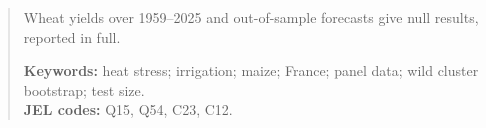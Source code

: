 \begin{abstract}
Wheat yields over 1959--2025 and out-of-sample forecasts give null results, reported in full.

\medskip\noindent\textbf{Keywords:} heat stress; irrigation; maize; France; panel data; wild cluster bootstrap; test size.\\
\textbf{JEL codes:} Q15, Q54, C23, C12.
\end{abstract}

